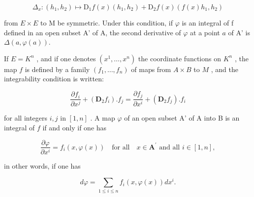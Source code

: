 \[
\Delta_ {x}: (h _ {1}, h _ {2}) \mapsto \mathrm{D} _ {1} f (x) (h _ {1}, h _ {2}) + \mathrm{D} _ {2} f (x) (f (x) h _ {1}, h _ {2})
\]

from \(E \times E\) to M be symmetric. Under this condition, if \(\varphi\) is an integral of f defined in an open subset A' of A, the second derivative of \(\varphi\) at a point \(a\) of A' is \(\Delta(a,\varphi(a))\).

If \(E = K^n\) , and if one denotes \((x^1, \ldots, x^n)\) the coordinate functions on \(K^n\) , the map \(f\) is defined by a family \((f_1, \ldots, f_n)\) of maps from \(A \times B\) to \(M\) , and the integrability condition is written:

\[
\frac {\partial f _ {i}}{\partial x ^ {j}} + (\mathbf {D} _ {2} f _ {i}). f _ {j} = \frac {\partial f _ {j}}{\partial x ^ {i}} + (\mathbf {D} _ {2} f _ {j}). f _ {i}
\]

for all integers \(i, j\) in \([1, n]\) . A map \(\varphi\) of an open subset A' of A into B is an integral of \(f\) if and only if one has

\[
\frac {\partial \varphi}{\partial x ^ {i}} = f _ {i} (x, \varphi (x)) \quad \text {for all} \quad x \in \mathbf {A} ^ {\prime} \text { and all } i \in [ 1, n ],
\]

in other words, if one has

\[
d \varphi = \sum_ {1 \leqslant i \leqslant n} f _ {i} (x, \varphi (x)) d x ^ {i}.
\]

